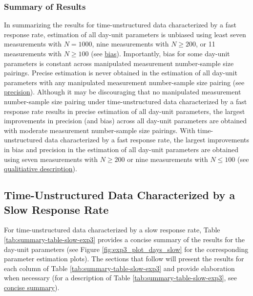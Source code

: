 \documentclass[
12pt, %
twoside,
english]{guelphthesis}
\begin{document}
\hypertarget{summary-of-results-9}{%
\subsubsection{Summary of Results}\label{summary-of-results-9}}

In summarizing the results for time-unstructured data characterized by a fast response rate, estimation of all day-unit parameters is unbiased using least seven measurements with \(N = 1000\), nine measurements with \(N \ge 200\), or 11 measurements with \(N \ge 100\) (see \protect\hyperlink{bias-fast-exp3}{bias}). Importantly, bias for some day-unit parameters is constant across manipulated measurement number-sample size pairings. Precise estimation is never obtained in the estimation of all day-unit parameters with any manipulated measurement number-sample size pairing (see \protect\hyperlink{precision-fast-exp3}{precision}). Although it may be discouraging that no manipulated measurement number-sample size pairing under time-unstructured data characterized by a fast response rate results in precise estimation of all day-unit parameters, the largest improvements in precision (and bias) across all day-unit parameters are obtained with moderate measurement number-sample size pairings. With time-unstructured data characterized by a fast response rate, the largest improvements in bias and precision in the estimation of all day-unit parameters are obtained using seven measurements with \(N \ge 200\) or nine measurements with \(N \le 100\) (see \protect\hyperlink{qualitative-fast-exp3}{qualitiative description}).

\hypertarget{time-unstructured-data-characterized-by-a-slow-response-rate}{%
\subsection{Time-Unstructured Data Characterized by a Slow Response Rate}\label{time-unstructured-data-characterized-by-a-slow-response-rate}}

For time-unstructured data characterized by a slow response rate, Table \ref{tab:summary-table-slow-exp3} provides a concise summary of the results for the day-unit parameters (see Figure \ref{fig:exp3_plot_days_slow} for the corresponding parameter estimation plots). The sections that follow will present the results for each column of Table \ref{tab:summary-table-slow-exp3} and provide elaboration when necessary (for a description of Table \ref{tab:summary-table-slow-exp3}, see \protect\hyperlink{concise-example-exp3}{concise summary}).
\end{document}
